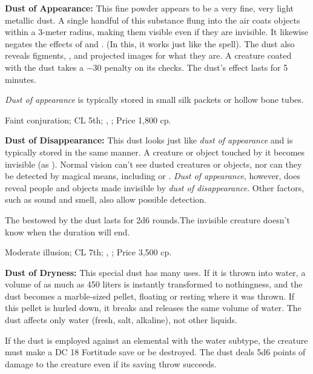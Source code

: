 \textbf{Dust of Appearance:} This fine powder appears to be a very fine, very light metallic dust. A single handful of this substance flung into the air coats objects within a 3-meter radius, making them visible even if they are invisible. It likewise negates the effects of  and . (In this, it works just like the  spell). The dust also reveals figments, , and projected images for what they are. A creature coated with the dust takes a $-30$ penalty on its  checks. The dust's effect lasts for 5 minutes.

\emph{Dust of appearance} is typically stored in small silk packets or hollow bone tubes.

Faint conjuration; CL 5th; , ; Price 1,800 cp.



\textbf{Dust of Disappearance:} This dust looks just like \emph{dust of appearance} and is typically stored in the same manner. A creature or object touched by it becomes invisible (as ). Normal vision can't see dusted creatures or objects, nor can they be detected by magical means, including  or . \emph{Dust of appearance}, however, does reveal people and objects made invisible by \emph{dust of disappearance}. Other factors, such as sound and smell, also allow possible detection.

The  bestowed by the dust lasts for 2d6 rounds.The invisible creature doesn't know when the duration will end.

Moderate illusion; CL 7th; , ; Price 3,500 cp.



\textbf{Dust of Dryness:} This special dust has many uses. If it is thrown into water, a volume of as much as 450 liters is instantly transformed to nothingness, and the dust becomes a marble-sized pellet, floating or resting where it was thrown. If this pellet is hurled down, it breaks and releases the same volume of water. The dust affects only water (fresh, salt, alkaline), not other liquids.

If the dust is employed against an elemental with the water subtype, the creature must make a DC 18 Fortitude save or be destroyed. The dust deals 5d6 points of damage to the creature even if its saving throw succeeds.

